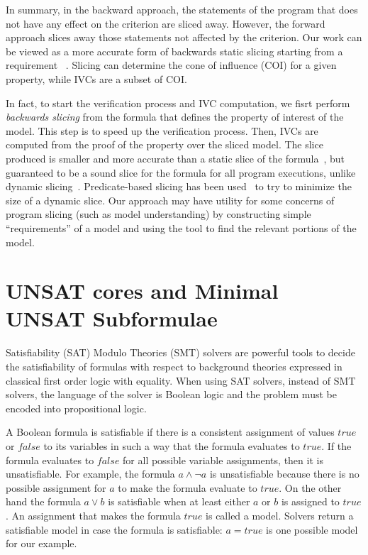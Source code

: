 In summary, in the backward approach, the statements of the program that does not have any effect on the criterion are sliced away. However, the forward approach slices away those statements not affected by the criterion.
Our work can be viewed as a more accurate form of backwards static slicing starting from a requirement ~\cite{Tip95asurvey}. Slicing can determine the cone of influence (COI) for a given property, while IVCs are a subset of COI.

In fact, to start the verification process and IVC computation, we fisrt perform {\em backwards slicing} from the formula that defines the property of interest of the model. This step is to speed up the verification process.
 Then, IVCs are computed from the proof of the property over the sliced model.  The slice produced is smaller and more accurate than a static slice of the formula~\cite{Weiser:1981:slicing}, but guaranteed to be a sound slice for the formula for all program executions, unlike dynamic slicing~\cite{Agrawal:1990:slicing}.  Predicate-based slicing has been used~\cite{Li04:slicing} to try to minimize the size of a dynamic slice.  Our approach may have utility for some concerns of program slicing (such as model understanding) by constructing simple ``requirements'' of a model and using the tool to find the relevant portions of the model.


\section{UNSAT cores and Minimal UNSAT Subformulae}
\label{sec:muses}
Satisfiability (SAT) Modulo Theories (SMT) solvers are powerful tools to decide the
satisfiability of formulas with respect to background theories expressed in classical first order logic with equality. When using SAT solvers, instead of SMT solvers,  the language of the solver is Boolean logic and the problem must be encoded into
propositional logic.

A Boolean formula is satisfiable if there is a consistent assignment of values $true$ or $false$ to its variables in such a way that the formula evaluates to $true$. If the formula evaluates to $false$ for all possible variable assignments, then it is unsatisfiable. For example, the formula
 $a \wedge \neg a$ is unsatisfiable because there is no possible
 assignment for $a$ to make the formula
 evaluate to $true$.
 On the other hand the formula
  $a \vee b$ is satisfiable when at least
  either $a$ or $b$
  is assigned to $true$. An assignment that makes the formula $true$ is called a model. Solvers return a satisfiable model in case the formula is satisfiable: $a = true$ is one possible model for our example.

